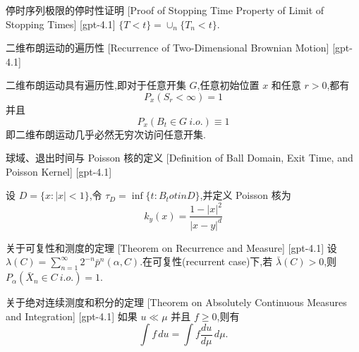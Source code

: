 \documentclass[UTF8]{ctexart}
\begin{document}
    
    
    \begin{prf}
        {停时序列极限的停时性证明}
        [Proof of Stopping Time Property of Limit of Stopping Times]
        [gpt-4.1]
        $\{ T < t \} = \cup_{n} \{ T_{n} < t \}$.
    \end{prf}
    
    
    
    \begin{thm}
        {二维布朗运动的遍历性}
        [Recurrence of Two-Dimensional Brownian Motion]
        [gpt-4.1]
        
二维布朗运动具有遍历性,即对于任意开集 $G$,任意初始位置 $x$ 和任意 $r>0$,都有
\[
P_{x}(S_{r} < \infty) = 1
\]
并且
\[
P_{x}(B_{t} \in G~i.o.) \equiv 1
\]
即二维布朗运动几乎必然无穷次访问任意开集.

    \end{thm}
    
    
    
    \begin{dfn}
        {球域、退出时间与 Poisson 核的定义}
        [Definition of Ball Domain, Exit Time, and Poisson Kernel]
        [gpt-4.1]
        
设 $D = \{ x : |x| < 1 \}$,令 $\tau_D = \operatorname{inf}\{ t : B_t 
otin D \}$,并定义 Poisson 核为
\[
k_y(x) = \frac{1 - |x|^2}{|x - y|^d}
\]

    \end{dfn}
    
    
    
    \begin{thm}
        {关于可复性和测度的定理}
        [Theorem on Recurrence and Measure]
        [gpt-4.1]
        设 $\lambda(C) = \sum_{n=1}^\infty 2^{-n} \bar{p}^n(\alpha, C)$.在可复性(recurrent case)下,若 $\bar{\lambda}(C) > 0$,则 $P_\alpha(\bar{X}_n \in C\ i.o.) = 1$.
    \end{thm}
    
    
    
    \begin{thm}
        {关于绝对连续测度和积分的定理}
        [Theorem on Absolutely Continuous Measures and Integration]
        [gpt-4.1]
        如果 $
u \ll \mu$ 并且 $f \geq 0$,则有
\[
\int f \, d
u = \int f \frac{d
u}{d\mu} \, d\mu.
\]

    \end{thm}
    
\end{document}
